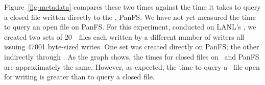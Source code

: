 Figure~\ref{fig-metadata} compares these two times against the time it takes to
query a closed file written directly to the \upfs, PanFS. We have not yet
measured the time to query an open file on PanFS. For this experiment,
conducted on LANL's \rrz, we created two sets of 20~\GB\ files each written by
a different number of writers all issuing 47001 byte-sized writes. One set was
created directly on PanFS; the other indirectly through \plfs.  As the graph
shows, the  times for closed files on \plfs\ and PanFS are
approximately the same.  However, as expected, the time to query a \plfs\ file
open for writing is greater than to query a closed file.




